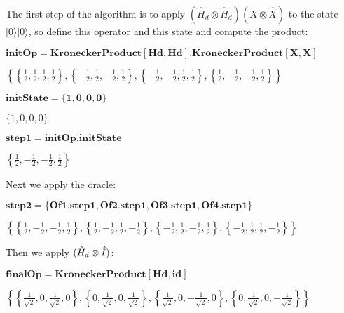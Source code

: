 The first step of the algorithm is to apply \((\hat{H}_d \otimes \hat{H}_d)(\hat{X} \otimes \hat{X})\) to the state \(|0\rangle|0\rangle\), so define this operator and this state and compute the
product:
\begin{doublespace}
    \noindent\(\pmb{\text{initOp} = \text{KroneckerProduct}[\text{Hd}, \text{Hd}].\text{KroneckerProduct}[X,X]}\)
\end{doublespace}
\begin{doublespace}
    \noindent\(\left\{\left\{\frac{1}{2},\frac{1}{2},\frac{1}{2},\frac{1}{2}\right\},\left\{-\frac{1}{2},\frac{1}{2},-\frac{1}{2},\frac{1}{2}\right\},\left\{-\frac{1}{2},-\frac{1}{2},\frac{1}{2},\frac{1}{2}\right\},\left\{\frac{1}{2},-\frac{1}{2},-\frac{1}{2},\frac{1}{2}\right\}\right\}\)
\end{doublespace}
\begin{doublespace}
    \noindent\(\pmb{\text{initState} = \{1, 0, 0, 0\}}\)
\end{doublespace}
\begin{doublespace}
    \noindent\(\{1,0,0,0\}\)
\end{doublespace}
\begin{doublespace}
    \noindent\(\pmb{\text{step1}=\text{initOp}.\text{initState}}\)
\end{doublespace}
\begin{doublespace}
    \noindent\(\left\{\frac{1}{2},-\frac{1}{2},-\frac{1}{2},\frac{1}{2}\right\}\)
\end{doublespace}
Next we apply the oracle:
\begin{doublespace}
    \noindent\(\pmb{\text{step2} = \{\text{Of1}.\text{step1}, \text{Of2}.\text{step1}, \text{Of3}.\text{step1}, \text{Of4}.\text{step1}\}}\)
\end{doublespace}
\begin{doublespace}
    \noindent\(\left\{\left\{\frac{1}{2},-\frac{1}{2},-\frac{1}{2},\frac{1}{2}\right\},\left\{\frac{1}{2},-\frac{1}{2},\frac{1}{2},-\frac{1}{2}\right\},\left\{-\frac{1}{2},\frac{1}{2},-\frac{1}{2},\frac{1}{2}\right\},\left\{-\frac{1}{2},\frac{1}{2},\frac{1}{2},-\frac{1}{2}\right\}\right\}\)
\end{doublespace}
Then we apply \((\hat{H}_d \otimes \hat{I})\):
\begin{doublespace}
    \noindent\(\pmb{\text{finalOp}=\text{KroneckerProduct}[\text{Hd}, \text{id}]}\)
\end{doublespace}
\begin{doublespace}
    \noindent\(\left\{\left\{\frac{1}{\sqrt{2}},0,\frac{1}{\sqrt{2}},0\right\},\left\{0,\frac{1}{\sqrt{2}},0,\frac{1}{\sqrt{2}}\right\},\left\{\frac{1}{\sqrt{2}},0,-\frac{1}{\sqrt{2}},0\right\},\left\{0,\frac{1}{\sqrt{2}},0,-\frac{1}{\sqrt{2}}\right\}\right\}\)
\end{doublespace}
